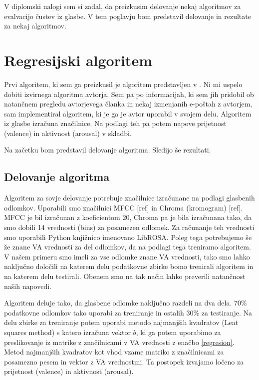 \documentclass[a4paper, 12pt]{book}
\begin{document}
{V diplomski nalogi sem si zadal, da preizkusim delovanje nekaj algoritmov za evalvacijo čustev iz glasbe. V tem poglavju bom predstavil delovanje in rezultate za nekaj algoritmov. 

\section{Regresijski algoritem}

Prvi algoritem, ki sem ga preizkusil je algoritem predstavljen v \cite{schmidt2009projection}. Ni mi uspelo dobiti izvirnega algoritma avtorja. Sem pa po informacijah, ki sem jih pridobil ob natančnem pregledu avtorjevega članka in nekaj izmenjanih e-poštah z avtorjem, sam implementiral algoritem, ki je ga je avtor uporabil v svojem delu. Algoritem iz glasbe izračuna značilnice. Na podlagi teh pa potem napove prijetnost (valence) in aktivnost (arousal) v skladbi. 

Na začetku bom predstavil delovanje algoritma. Sledijo še rezultati.

\subsection{Delovanje algoritma} 

Algoritem za sovje delovanje potrebuje značilnice izračunane na podlagi glasbenih odlomkov. Uporabili smo značilnici MFCC [ref] in Chroma (kromogram) [ref]. MFCC je bil izračunan z koeficientom 20, Chroma pa je bila izračunana tako, da smo dobili 14 vrednosti (bins) za posamezen odlomek. Za računanje teh vrednosti smo uporabili Python knjižnico imenovano LibROSA. Poleg tega potrebujemo še že znane VA vrednosti za del odlomkov, da na podlagi tega treniramo algoritem. V našem primeru smo imeli za vse odlomke znane VA vrednosti, tako smo lahko naključno določili na katerem delu podatkovne zbirke bomo trenirali algoritem in na katerem delu testirali. Obenem smo na tak način lahko preverili natančnost naših napovedi.

Algoritem deluje tako, da glasbene odlomke naključno razdeli na dva dela. 70\% podatkovne odlomkov tako uporabi za treniranje in ostalih 30\% za testiranje. Na delu zbirke za treniranje potem uporabi metodo najmanjših kvadratov (Leat squares method) \cite{abdi2007method} s katero izračuna vektor $b$, ki ga potem uporabimo za preslikovanje iz matrike z značilnicami v VA vrednosti z enačbo \ref{regresion}. Metod najmanjših kvadratov kot vhod vzame matriko z značilnicami za posamezno pesem in vektor z VA vrednostmi. Ta postopek izvajamo ločeno za prijetnost (valence) in aktivnost (arousal).  

}
\end{document}
